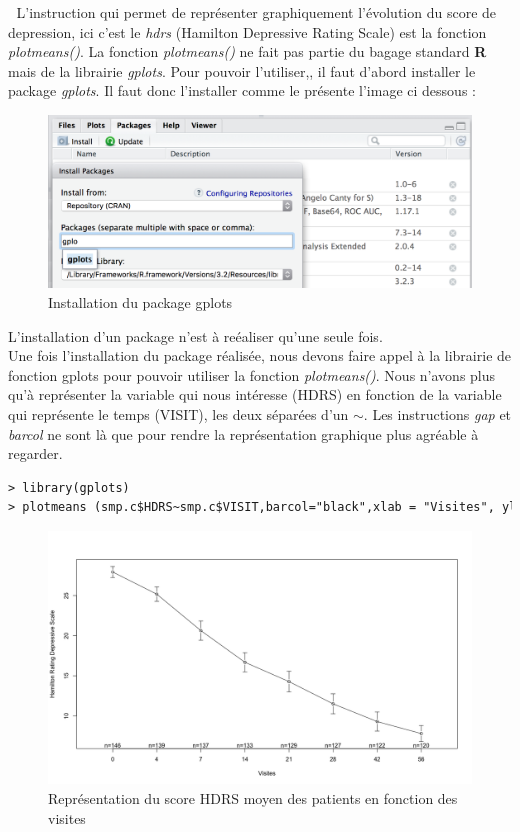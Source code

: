 \textcolor{white}{.}\newline
L'instruction qui permet de représenter graphiquement  l'évolution du score de depression, ici c'est le \textit{hdrs} (Hamilton Depressive Rating Scale) est la fonction \textit{plotmeans()}.\newline
La fonction \textit{plotmeans()} ne fait pas partie du bagage standard \textbf{R} mais de la librairie \textit{gplots}. Pour pouvoir l'utiliser,, il faut d'abord installer le package \textit{gplots}. Il faut donc l'installer comme le présente l'image ci dessous : 
\begin{figure}[H]\begin{center}\includegraphics[scale=0.5]{ilu/tp8.png}\caption{Installation du package gplots}\end{center}\end{figure}
L'installation d'un package n'est à reéaliser qu'une seule fois.\newline
\\
Une fois l'installation du package réalisée, nous devons faire appel à la librairie de fonction gplots pour pouvoir utiliser la fonction \textit{plotmeans()}. Nous n'avons plus qu'à représenter la variable qui nous intéresse (HDRS) en fonction de la variable qui représente le temps (VISIT), les deux séparées d'un $\sim$. Les instructions \textit{gap} et \textit{barcol} ne sont là que pour rendre la représentation graphique plus agréable à regarder. 
\begin{lstlisting}[language=html]
> library(gplots)
> plotmeans (smp.c$HDRS~smp.c$VISIT,barcol="black",xlab = "Visites", ylab = "Hamilton Rating Depressive Scale")
\end{lstlisting}
\begin{figure}[H]\begin{center}\includegraphics[scale=0.4]{ilu/tp9.png}\caption{Représentation du score HDRS moyen des patients en fonction des visites}\end{center}\end{figure}
